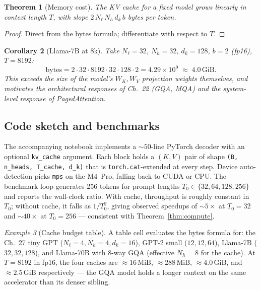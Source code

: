 \documentclass[11pt]{article}
\newtheorem{theorem}{Theorem}[section]
\newtheorem{corollary}[theorem]{Corollary}
\theoremstyle{remark}
\newtheorem{example}[theorem]{Example}
\begin{document}
\begin{theorem}[Memory cost]\label{thm:mem}
The KV cache for a fixed model grows linearly in context length $T$, with slope $2 \, N_\ell \, N_h \, d_k \, b$ bytes per token.
\end{theorem}

\begin{proof}
Direct from the bytes formula; differentiate with respect to $T$.
\end{proof}

\begin{corollary}[Llama-7B at 8k]
Take $N_\ell = 32$, $N_h = 32$, $d_k = 128$, $b = 2$ (fp16), $T = 8192$:
\[ \mathrm{bytes} = 2 \cdot 32 \cdot 8192 \cdot 32 \cdot 128 \cdot 2 = 4.29 \times 10^9 \;\approx\; 4.0 \,\mathrm{GiB}. \]
This exceeds the size of the model's $W_K, W_V$ projection weights themselves, and motivates the architectural responses of Ch.~22 (GQA, MQA) and the system-level response of PagedAttention.
\end{corollary}

\subsection*{Code sketch and benchmarks}

The accompanying notebook implements a $\sim 50$-line PyTorch decoder with an optional \texttt{kv\_cache} argument. Each block holds a $(K, V)$ pair of shape \texttt{(B, n\_heads, T\_cache, d\_k)} that is \texttt{torch.cat}-extended at every step. Device auto-detection picks \texttt{mps} on the M4~Pro, falling back to CUDA or CPU. The benchmark loop generates 256 tokens for prompt lengths $T_0 \in \{32, 64, 128, 256\}$ and reports the wall-clock ratio. With cache, throughput is roughly constant in $T_0$; without cache, it falls as $1/T_0^2$, giving observed speedups of $\sim 5\times$ at $T_0 = 32$ and $\sim 40\times$ at $T_0 = 256$ --- consistent with Theorem~\ref{thm:compute}.

\begin{example}[Cache budget table]
A table cell evaluates the bytes formula for: the Ch.~27 tiny GPT (\(N_\ell=4, N_h=4, d_k=16\)), GPT-2 small (\(12, 12, 64\)), Llama-7B (\(32, 32, 128\)), and Llama-70B with 8-way GQA (effective \(N_h=8\) for the cache). At $T=8192$ in fp16, the four caches are \(\approx 16\,\mathrm{MiB}\), \(\approx 288\,\mathrm{MiB}\), \(\approx 4.0\,\mathrm{GiB}\), and \(\approx 2.5\,\mathrm{GiB}\) respectively --- the GQA model holds a longer context on the same accelerator than its denser sibling.
\end{example}
\end{document}
